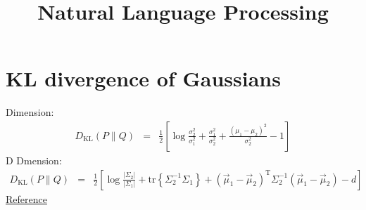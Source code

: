 \documentclass[a4paper,10.5pt]{jsarticle}  %
\begin{document}
\title{Natural Language Processing}
\date{}
\maketitle

\section{KL divergence of Gaussians}
 Dimension:
\begin{eqnarray*} 
D_{\mathrm{KL}}(P\|Q) &=& \frac{1}{2}\left[\log \frac{\sigma_2^2}{\sigma_1^2} + \frac{\sigma_1^2}{\sigma^2_2} + \frac{(\mu_1 - \mu_2)^2}{\sigma^2_2} - 1 \right] 
\end{eqnarray*}
D Dmension:
\begin{eqnarray*} 
D_{\mathrm{KL}}(P\|Q) &=& \frac{1}{2}\left[\log \frac{|\Sigma_2|}{|\Sigma_1|} + \mathrm{tr}\left\{\Sigma_2^{-1}\Sigma_1\right\} + ({\vec \mu_1} - {\vec \mu_2})^\mathrm{T} \Sigma_2^{-1} ({\vec \mu_1} - {\vec \mu_2}) -d\right] 
\end{eqnarray*}
\href{http://sucrose.hatenablog.com/entry/2013/07/20/190146}{Reference}
\end{document}
